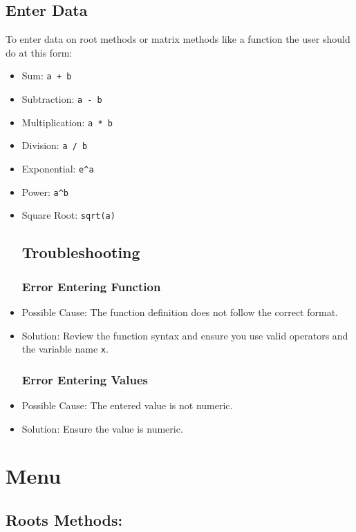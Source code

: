 \documentclass{uofa-eng-assignment}
\begin{document}
\subsection{Enter Data}
To enter data on root methods or matrix methods like a function the user should do at this form:
\begin{itemize}
    \item Sum: \verb|a + b|
    \item Subtraction: \verb|a - b|
    \item Multiplication: \verb|a * b|
    \item Division: \verb|a / b|
    \item Exponential: \verb|e^a|
    \item Power: \verb|a^b|
    \item Square Root: \verb|sqrt(a)|

\subsection{Troubleshooting}

\subsubsection{Error Entering Function}
    \item Possible Cause: The function definition does not follow the correct format.
    \item Solution: Review the function syntax and ensure you use valid operators and the variable name \verb|x|.

\subsubsection{Error Entering Values}
    \item Possible Cause: The entered value is not numeric.
    \item Solution: Ensure the value is numeric.
 
\end{itemize}


\section{Menu}
\subsection{Roots Methods:}
    
\end{document}
